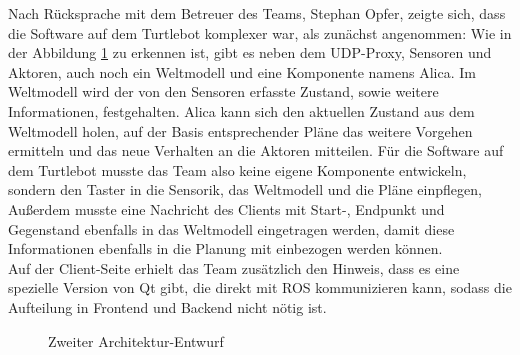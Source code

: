 \documentclass[a4paper,12pt,headsepline]{scrartcl}
\begin{document}
		Nach Rücksprache mit dem Betreuer des Teams, Stephan Opfer, zeigte sich, dass die Software auf dem Turtlebot komplexer war, als zunächst angenommen: Wie in der Abbildung \ref{fig:arch02} zu erkennen ist, gibt es neben dem UDP-Proxy, Sensoren und Aktoren, auch noch ein Weltmodell und eine Komponente namens \glqq Alica\grqq . Im Weltmodell wird der von den Sensoren erfasste Zustand, sowie weitere Informationen, festgehalten. Alica kann sich den aktuellen Zustand aus dem Weltmodell holen, auf der Basis entsprechender Pläne das weitere Vorgehen ermitteln und das neue Verhalten an die Aktoren mitteilen. Für die Software auf dem Turtlebot musste das Team also keine eigene Komponente entwickeln, sondern den Taster in die Sensorik, das Weltmodell und die Pläne einpflegen, Außerdem musste eine Nachricht des Clients mit Start-, Endpunkt und Gegenstand ebenfalls in das Weltmodell eingetragen werden, damit diese Informationen ebenfalls in die Planung mit einbezogen werden können. \\
		Auf der Client-Seite erhielt das Team zusätzlich den Hinweis, dass es eine spezielle Version von Qt gibt, die direkt mit ROS kommunizieren kann, sodass die Aufteilung in Frontend und Backend nicht nötig ist.
		\begin{figure}[H]
			\centering
			\resizebox{\textwidth}{!}{}
			\caption{Zweiter Architektur-Entwurf}
			\label{fig:arch02}
		\end{figure}
		
\end{document}
